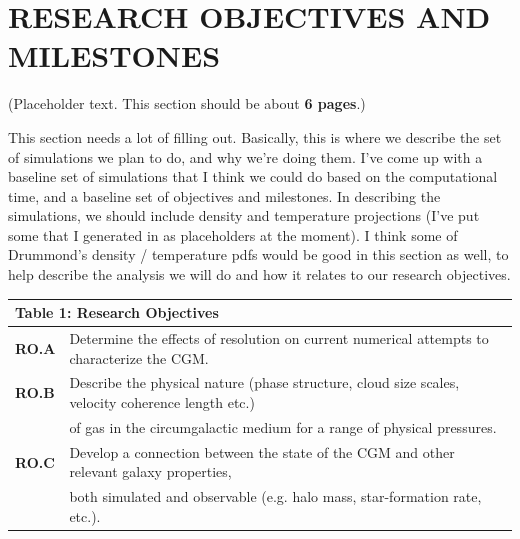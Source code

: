 \documentclass[11pt,letterpaper,english]{article}
\begin{document}
\vspace{-.25in}
\section{RESEARCH OBJECTIVES AND MILESTONES }  
\vspace{-.2in}

(Placeholder text. This section should be about {\bf 6 pages}.)

This section needs a lot of filling out. Basically, this is where we describe the set of simulations we plan to do, and why we're doing them. I've come up with a baseline set of simulations that I think we could do based on the computational time, and a baseline set of objectives and milestones. In describing the simulations, we should include density and temperature projections (I've put some that I generated in as placeholders at the moment). I think some of Drummond's density / temperature pdfs would be good in this section as well, to help describe the analysis we will do and how it relates to our research objectives.

\begin{table}[h]
\vspace{-.12in}
\begin{tabular}{|l|l|} 
\multicolumn{2}{l}{\bf{Table 1: Research Objectives}}\\
\hline
\textbf{RO.A} & Determine the effects of resolution on current numerical attempts to characterize the CGM. \\ \hline
\textbf{RO.B} & Describe the physical nature (phase structure, cloud size scales, velocity coherence length etc.) \\
& of gas in the circumgalactic medium for a range of physical pressures. \\ \hline
\textbf{RO.C} & Develop a connection between the state of the CGM and other relevant galaxy properties, \\
& both simulated and observable (e.g. halo mass, star-formation rate, etc.). \\
\hline
\end{tabular}
\end{table}
\end{document}
